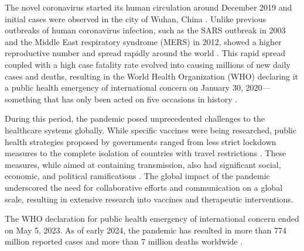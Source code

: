 The novel coronavirus started its human circulation around December 2019 and initial cases were observed in the city of Wuhan, China \citep{bergeri2022EarlyEpidemiological}.
Unlike previous outbreaks of human coronavirus infection, such as the SARS outbreak in 2003 and the Middle East respiratory syndrome (MERS) in 2012, \covid showed a higher reproductive number and spread rapidly around the world \citep{liu2020ReproductiveNumber}.
This rapid spread coupled with a high case fatality rate evolved into causing millions of new daily cases and deaths, resulting in the World Health Organization (WHO) declaring it a public health emergency of international concern on January 30, 2020---something that has only been acted on five occasions in history \citep{wilder-smith2020PublicHealth}.

During this period, the \covid pandemic posed unprecedented challenges to the healthcare systems globally.
While specific vaccines were being researched, public health strategies proposed by governments ranged from less strict lockdown measures to the complete isolation of countries with travel restrictions \citep{wilder-smith2020PublicHealth}.
These measures, while aimed at containing transmission, also had significant social, economic, and political ramifications \citep{chu2020SocialConsequences}.
The global impact of the pandemic underscored the need for collaborative efforts and communication on a global scale, resulting in extensive research into vaccines and therapeutic interventions.

The WHO declaration for public health emergency of international concern ended on May 5, 2023.
As of early 2024, the pandemic has resulted in more than 774 million reported cases and more than 7 million deaths worldwide \citep{worldhealthorganization2023WHOCoronavirus}.


